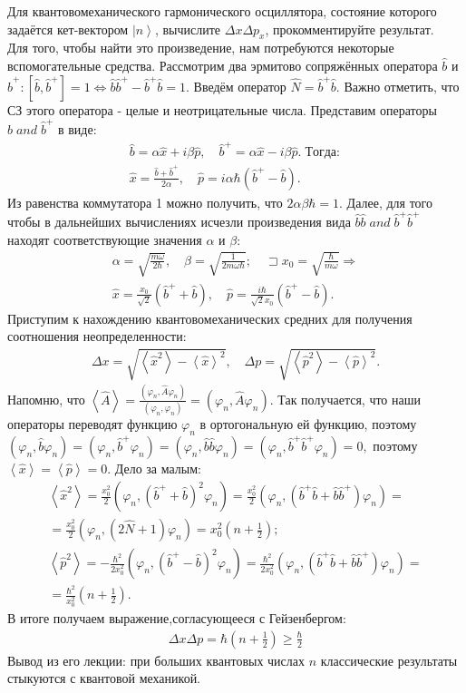 \documentclass[__main__.tex]{subfiles}
\begin{document}
Для квантовомеханического гармонического осциллятора, состояние которого задаётся кет-вектором $\left|n\right>$, вычислите $\Delta{x}\Delta{p_x}$, прокомментируйте результат.\\ 

Для того, чтобы найти это произведение, нам потребуются некоторые вспомогательные средства. Рассмотрим два эрмитово сопряжённых оператора $\hat{b}$ и $\hat{b}^+: \left[\hat{b},\hat{b}^+\right]=1 \Leftrightarrow \hat{b}\hat{b}^+-\hat{b}^+\hat{b}=1.$ Введём оператор $\hat{N}=\hat{b}^+\hat{b}.$ Важно отметить, что СЗ этого оператора - целые и неотрицательные числа.
Представим операторы $\hat{b}\;and\;\hat{b}^+$ в виде:
\begin{gather*}
\hat{b}=\alpha\hat{x}+i\beta\hat{p},\quad
\hat{b}^+=\alpha\hat{x}-i\beta\hat{p}.\; Тогда:\\
\hat{x}=\frac{\hat{b}+\hat{b}^+}{2\alpha},\quad
\hat{p}=i\alpha\hbar\left(\hat{b}^+-\hat{b}\right).
\end{gather*}
Из равенства коммутатора 1 можно получить, что $2\alpha\beta\hbar=1.$ Далее, для того чтобы в дальнейших вычислениях исчезли произведения вида $\hat{b}\hat{b}\;and\;\hat{b}^+\hat{b}^+$ находят соответствующие значения $α$ и $β$:
\begin{gather*}
\alpha=\sqrt{\frac{m\omega}{2\hbar}},\quad\beta=\sqrt{\frac{1}{2m\omega\hbar}};\quad\sqsupset x_0=\sqrt{\frac{\hbar}{m\omega}}\Rightarrow\\
\hat{x}=\frac{x_0}{\sqrt{2}}\left(\hat b^++\hat b\right),\quad \hat p=\frac{i\hbar}{\sqrt{2}x_0}\left(\hat b^+-\hat b\right).
\end{gather*}
Приступим к нахождению квантовомеханических средних для получения соотношения неопределенности:
\begin{gather*}
\Delta x=\sqrt{\left<\hat x^2\right>-\left<\hat x\right>^2},\quad
\Delta p=\sqrt{\left<\hat p^2\right>-\left<\hat p\right>^2}.
\end{gather*}
Напомню, что $\left<\hat A\right>=\frac{\left(\varphi_n,\hat A\varphi_n\right)}{\left(\varphi_n,\varphi_n\right)}=\left(\varphi_n,\hat A\varphi_n\right).$ Так получается, что наши операторы переводят функцию $\varphi_n$ в ортогональную ей функцию, поэтому $(\varphi_n,\hat b\varphi_n)=(\varphi_n,\hat b^+\varphi_n)=(\varphi_n,\hat b\hat b\varphi_n)=(\varphi_n,\hat b^+\hat b^+\varphi_n)=0,$ поэтому $\left<\hat x\right>=\left<\hat p\right>=0.$ Дело за малым:
\begin{gather*}
\left<\hat x^2\right>=\frac{x_0^2}{2}(\varphi_n,(\hat b^++\hat b)^2\varphi_n)=\frac{x_0^2}{2}(\varphi_n,(\hat b^+\hat b+\hat b\hat b^+)\varphi_n)=\\
=\frac{x_0^2}{2}(\varphi_n,(2\hat N+1)\varphi_n)=x_0^2\left(n+\frac{1}{2}\right);\\
\left<\hat p^2\right>=-\frac{\hbar^2}{2x_0^2}(\varphi_n,(\hat b^+-\hat b)^2\varphi_n)=\frac{\hbar^2}{2x_0^2}(\varphi_n,(\hat b^+\hat b+\hat b\hat b^+)\varphi_n)=\\
=\frac{\hbar^2}{x_0^2}\left(n+\frac{1}{2}\right).
\end{gather*}
В итоге получаем выражение,согласующееся с Гейзенбергом:
\begin{gather*}
\Delta x\Delta p=\hbar\left(n+\frac{1}{2}\right)\ge\frac{\hbar}{2}
\end{gather*}
Вывод из его лекции: при больших квантовых числах $n$ классические результаты стыкуются с квантовой механикой.
\end{document}
